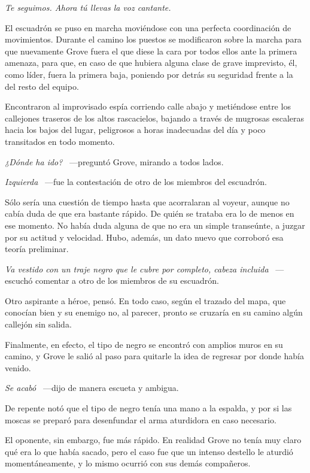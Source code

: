 \emph{Te seguimos. Ahora tú llevas la voz cantante.}

El escuadrón se puso en marcha moviéndose con una perfecta coordinación de movimientos. Durante el camino los puestos se modificaron sobre la marcha para que nuevamente Grove fuera el que diese la cara por todos ellos ante la primera amenaza, para que, en caso de que hubiera alguna clase de grave imprevisto, él, como líder, fuera la primera baja, poniendo por detrás su seguridad frente a la del resto del equipo.

Encontraron al improvisado espía corriendo calle abajo y metiéndose entre los callejones traseros de los altos rascacielos, bajando a través de mugrosas escaleras hacia los bajos del lugar, peligrosos a horas inadecuadas del día y poco transitados en todo momento.

\emph{¿Dónde ha ido?} ~---preguntó Grove, mirando a todos lados.

\emph{Izquierda} ~---fue la contestación de otro de los miembros del escuadrón.

Sólo sería una cuestión de tiempo hasta que acorralaran al voyeur, aunque no cabía duda de que era bastante rápido. De quién se trataba era lo de menos en ese momento. No había duda alguna de que no era un simple transeúnte, a juzgar por su actitud y velocidad. Hubo, además, un dato nuevo que corroboró esa teoría preliminar.

\emph{Va vestido con un traje negro que le cubre por completo, cabeza incluida} ~---escuchó comentar a otro de los miembros de su escuadrón.

Otro aspirante a héroe, pensó. En todo caso, según el trazado del mapa, que conocían bien y su enemigo no, al parecer, pronto se cruzaría en su camino algún callejón sin salida.

Finalmente, en efecto, el tipo de negro se encontró con amplios muros en su camino, y Grove le salió al paso para quitarle la idea de regresar por donde había venido.

\emph{Se acabó} ~---dijo de manera escueta y ambigua.

De repente notó que el tipo de negro tenía una mano a la espalda, y por si las moscas se preparó para desenfundar el arma aturdidora en caso necesario.

El oponente, sin embargo, fue más rápido. En realidad Grove no tenía muy claro qué era lo que había sacado, pero el caso fue que un intenso destello le aturdió momentáneamente, y lo mismo ocurrió con sus demás compañeros.

